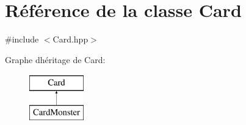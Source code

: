 \hypertarget{classCard}{}\section{Référence de la classe Card}
\label{classCard}


{\ttfamily \#include $<$Card.\+hpp$>$}

Graphe d\textquotesingle{}héritage de Card\+:\begin{figure}[H]
\begin{center}
\leavevmode
\includegraphics[height=2.000000cm]{classCard}
\end{center}
\end{figure}
